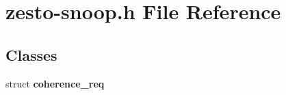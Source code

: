 \section{zesto-snoop.h File Reference}
\label{zesto-snoop_8h}
\subsection*{Classes}
\begin{CompactItemize}
\item 
struct {\bf coherence\_\-req}
\end{CompactItemize}
